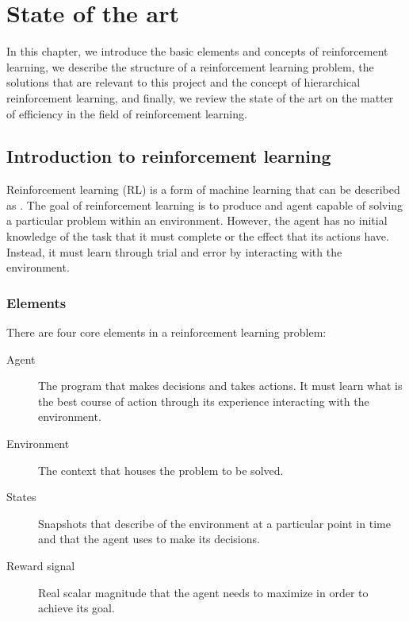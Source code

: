 \chapter{State of the art}
\label{chapter:state_of_the_art}

In this chapter, we introduce the basic elements and concepts of reinforcement learning, we describe the structure of a reinforcement learning problem, the solutions that are relevant to this project and the concept of hierarchical reinforcement learning, and finally, we review the state of the art on the matter of efficiency in the field of reinforcement learning.

\section{Introduction to reinforcement learning}

Reinforcement learning (RL) is a form of machine learning that can be described as  \cite{Kaelbling:1996}. The goal of reinforcement learning is to produce and agent capable of solving a particular problem within an environment. However, the agent has no initial knowledge of the task that it must complete or the effect that its actions have. Instead, it must learn through trial and error by interacting with the environment.

\subsection{Elements}

There are four core elements in a reinforcement learning problem:

\begin{description}
    \item[Agent] The program that makes decisions and takes actions. It must learn what is the best course of action through its experience interacting with the environment.
    \item[Environment] The context that houses the problem to be solved.
    \item[States] Snapshots that describe of the environment at a particular point in time and that the agent uses to make its decisions.
    \item[Reward signal] Real scalar magnitude that the agent needs to maximize in order to achieve its goal.
\end{description}

